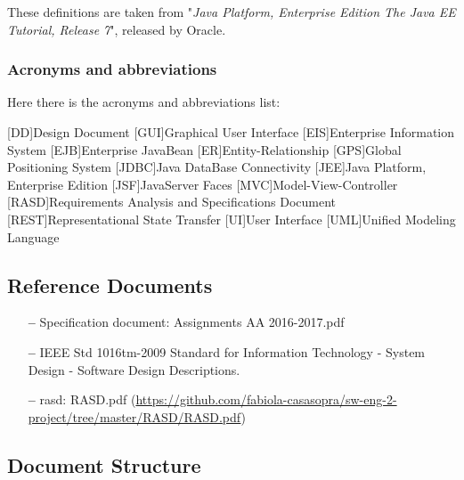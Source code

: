 These definitions are taken from "\textit{Java Platform, Enterprise Edition The Java EE Tutorial, Release 7}", released by Oracle.

\subsubsection{Acronyms and abbreviations } \label{acr}
Here there is the acronyms and abbreviations list:

\begin{acronym}[DD] %

[DD]{Design Document}
[GUI]{Graphical User Interface}
[EIS]{Enterprise Information System}
[EJB]{Enterprise JavaBean}
[ER]{Entity-Relationship}
[GPS]{Global Positioning System}
[JDBC]{Java DataBase Connectivity}
[JEE]{Java Platform, Enterprise Edition}
[JSF]{JavaServer Faces}
[MVC]{Model-View-Controller}
[RASD]{Requirements Analysis and Specifications Document}
[REST]{Representational State Transfer}
[UI]{User Interface}
[UML]{Unified Modeling Language}

\end{acronym}

\subsection{Reference Documents} \label{ref-doc}

\begin{itemize}
\item[\textbf{--}] Specification document: Assignments AA 2016-2017.pdf
\item[\textbf{--}] IEEE Std 1016tm-2009 Standard for Information Technology - System Design - Software Design Descriptions.
\item[\textbf{--}] \acl{rasd}: RASD.pdf 
\newline
(\url{https://github.com/fabiola-casasopra/sw-eng-2-project/tree/master/RASD/RASD.pdf})
\end{itemize}

\subsection{Document Structure} \label{doc-struct}


